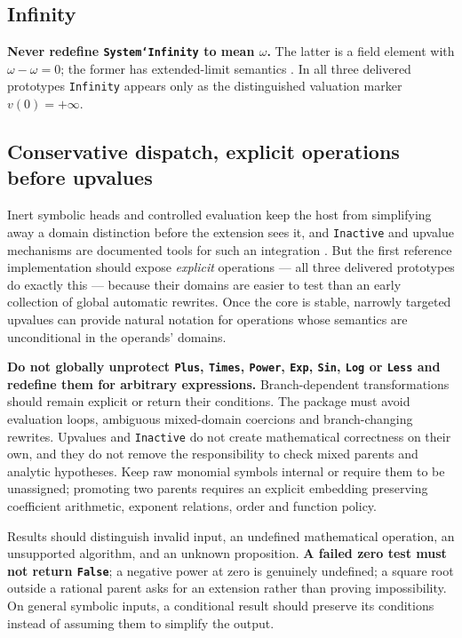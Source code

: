 \documentclass[11pt,letterpaper]{article}
\numberwithin{equation}{section}
\theoremstyle{definition}
\theoremstyle{remark}
\begin{document}
\subsection{Infinity}
\label{cas:sub-infinity}
\textbf{Never redefine \texttt{System`Infinity} to mean $\omega$.} The latter is
a field element with $\omega-\omega=0$; the former has extended-limit semantics
\cite{cas:WLInfinity}. In all three delivered prototypes \texttt{Infinity}
appears only as the distinguished valuation marker $v(0)=+\infty$.

\subsection{Conservative dispatch, explicit operations before upvalues}
\label{cas:sub-dispatch}
Inert symbolic heads and controlled evaluation keep the host from simplifying
away a domain distinction before the extension sees it, and \texttt{Inactive}
and upvalue mechanisms are documented tools for such an integration
\cite{cas:WLInactive,cas:WLUpValues}. But the first reference implementation
should expose \emph{explicit} operations --- all three delivered prototypes do
exactly this --- because their domains are easier to test than an early
collection of global automatic rewrites. Once the core is stable, narrowly
targeted upvalues can provide natural notation for operations whose semantics
are unconditional in the operands' domains.

\textbf{Do not globally unprotect \texttt{Plus}, \texttt{Times},
\texttt{Power}, \texttt{Exp}, \texttt{Sin}, \texttt{Log} or \texttt{Less} and
redefine them for arbitrary expressions.} Branch-dependent transformations
should remain explicit or return their conditions. The package must avoid
evaluation loops, ambiguous mixed-domain coercions and branch-changing rewrites.
Upvalues and \texttt{Inactive} do not create mathematical correctness on their
own, and they do not remove the responsibility to check mixed parents and
analytic hypotheses. Keep raw monomial symbols internal or require them to be
unassigned; promoting two parents requires an explicit embedding preserving
coefficient arithmetic, exponent relations, order and function policy.

Results should distinguish invalid input, an undefined mathematical operation,
an unsupported algorithm, and an unknown proposition. \textbf{A failed zero test
must not return \texttt{False}}; a negative power at zero is genuinely
undefined; a square root outside a rational parent asks for an extension rather
than proving impossibility. On general symbolic inputs, a conditional result
should preserve its conditions instead of assuming them to simplify the output.
\end{document}
